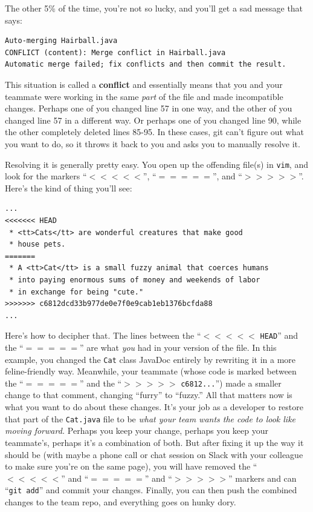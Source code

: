 \begin{itemize}
The other 5\% of the time, you're not so lucky, and you'll get a sad message
that says:

\begin{Verbatim}[fontsize=\small,samepage=true,frame=none]
Auto-merging Hairball.java
CONFLICT (content): Merge conflict in Hairball.java
Automatic merge failed; fix conflicts and then commit the result.
\end{Verbatim}

This situation is called a \textbf{conflict} and essentially means that you
and your teammate were working in the same \textit{part} of the file and made
incompatible changes. Perhaps one of you changed line 57 in one way, and the
other of you changed line 57 in a different way. Or perhaps one of you changed
line 90, while the other completely deleted lines 85-95. In these cases, git
can't figure out what you want to do, so it throws it back to you and asks you
to manually resolve it.

Resolving it is generally pretty easy. You open up the offending file(s) in
\texttt{vim}, and look for the markers ``$<<<<<$'', ``$=====$'', and
``$>>>>>$''. Here's the kind of thing you'll see:

\begin{Verbatim}[fontsize=\small,samepage=true,frame=single]
...
<<<<<<< HEAD
 * <tt>Cats</tt> are wonderful creatures that make good 
 * house pets.
=======
 * A <tt>Cat</tt> is a small fuzzy animal that coerces humans
 * into paying enormous sums of money and weekends of labor
 * in exchange for being "cute."
>>>>>>> c6812dcd33b977de0e7f0e9cab1eb1376bcfda88
...
\end{Verbatim}

Here's how to decipher that. The lines between the ``$<<<<<$ \texttt{HEAD}''
and the ``$=====$'' are what \textit{you} had in your version of the file. In
this example, you changed the \texttt{Cat} class JavaDoc entirely by rewriting
it in a more feline-friendly way. Meanwhile, your teammate (whose code is
marked between the ``$=====$'' and the ``$>>>>>$ \texttt{c6812...}'') made a
smaller change to that comment, changing ``furry'' to ``fuzzy.'' All that
matters now is what you want to do about these changes. It's your job as a
developer to restore that part of the \texttt{Cat.java} file to be \textit{what
your team wants the code to look like moving forward.} Perhaps you keep your
change, perhaps you keep your teammate's, perhaps it's a combination of both.
But after fixing it up the way it should be (with maybe a phone call or chat
session on Slack with your colleague to make sure you're on the same page), you
will have removed the ``$<<<<<$'' and ``$=====$'' and ``$>>>>>$'' markers and
can ``\texttt{git add}'' and commit your changes. Finally, you can then push
the combined changes to the team repo, and everything goes on hunky dory.


\end{itemize}
